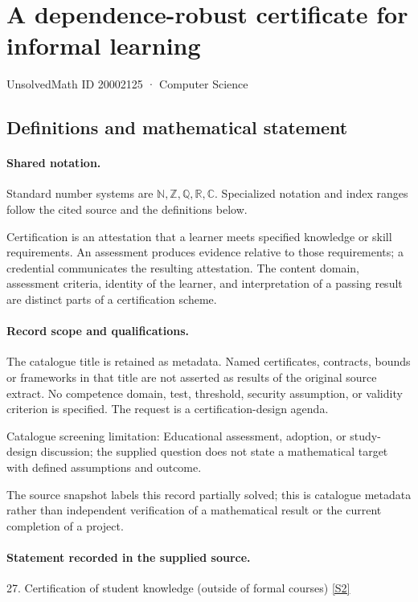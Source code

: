 \documentclass[11pt]{article}
\newcommand{\sref}[2]{\hyperlink{source:#1:#2}{[S#2]}}
\begin{document}
\setcounter{section}{20002124}
\section{A dependence-robust certificate for informal learning}\label{20002125}
{\small\sffamily UnsolvedMath ID 20002125 · Computer Science}
\subsection{Definitions and mathematical statement}

\paragraph{Shared notation.}Standard number systems are $\mathbb N,\mathbb Z,\mathbb Q,\mathbb R,\mathbb C$. Specialized notation and index ranges follow the cited source and the definitions below.


Certification is an attestation that a learner meets specified knowledge or skill requirements. An assessment produces evidence relative to those requirements; a credential communicates the resulting attestation. The content domain, assessment criteria, identity of the learner, and interpretation of a passing result are distinct parts of a certification scheme.
\paragraph{Record scope and qualifications.}
The catalogue title is retained as metadata. Named certificates, contracts, bounds or frameworks in that title are not asserted as results of the original source extract.
No competence domain, test, threshold, security assumption, or validity criterion is specified. The request is a certification-design agenda.

Catalogue screening limitation: Educational assessment, adoption, or study-design discussion; the supplied question does not state a mathematical target with defined assumptions and outcome.

The source snapshot labels this record partially solved; this is catalogue metadata rather than independent verification of a mathematical result or the current completion of a project.
\paragraph{Statement recorded in the supplied source.}
27. Certification of student knowledge (outside of formal courses) \sref{20002125}{2}
\end{document}
